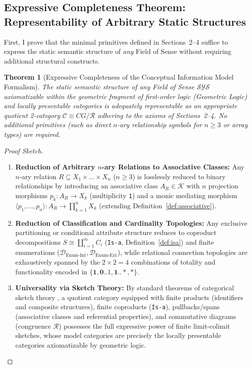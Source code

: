 \documentclass[11pt,a4paper]{article}
\theoremstyle{definition}
\theoremstyle{plain}
\newtheorem{theorem}{Theorem}[section]
\theoremstyle{remark}
\newcommand{\Denumint}{\mathcal{D}_{\mathrm{Enum\text{-}Int}}}
\newcommand{\Denumext}{\mathcal{D}_{\mathrm{Enum\text{-}Ext}}}
\begin{document}
\subsection{Expressive Completeness Theorem: Representability of Arbitrary Static Structures}
First, I prove that the minimal primitives defined in Sections~2--4 suffice to express the static semantic structure of \emph{any} Field of Sense without requiring additional structural constructs.

\begin{theorem}[Expressive Completeness of the Conceptual Information Model Formalism]\label{thm:completeness}
The static semantic structure of any Field of Sense $\mathcal{SYS}$ axiomatizable within the geometric fragment of first-order logic (Geometric Logic) and locally presentable categories is adequately representable as an appropriate quotient 2-category $\mathcal{C} \equiv CG/\mathcal{R}$ adhering to the axioms of Sections~2--4. No additional primitives (such as direct $n$-ary relationship symbols for $n \ge 3$ or array types) are required.
\end{theorem}

\begin{proof}[Proof Sketch]
\begin{enumerate}
    \item \textbf{Reduction of Arbitrary $n$-ary Relations to Associative Classes:} Any $n$-ary relation $R \subseteq X_1 \times \dots \times X_n$ ($n \ge 3$) is losslessly reduced to binary relationships by introducing an associative class $A_R \in \mathcal{K}$ with $n$ projection morphisms $p_k : A_R \to X_k$ (multiplicity \texttt{1}) and a monic mediating morphism $\langle p_1, \dots, p_n \rangle : A_R \to \prod_{k=1}^n X_k$ (extending Definition~\ref{def:associative}).
    \item \textbf{Reduction of Classification and Cardinality Topologies:} Any exclusive partitioning or conditional attribute structure reduces to coproduct decompositions $S \cong \coprod_{i=1}^m C_i$ (\texttt{Is-a}, Definition~\ref{def:isa}) and finite enumerations ($\Denumint, \Denumext$), while relational connection topologies are exhaustively spanned by the $2 \times 2 = 4$ combinations of totality and functionality encoded in $\{\mathbf{1}, \mathbf{0..1}, \mathbf{1..*}, \mathbf{*}\}$.
    \item \textbf{Universality via Sketch Theory:} By standard theorems of categorical sketch theory \cite{gabriel1971,barr1990}, a quotient category equipped with finite products (identifiers and composite structures), finite coproducts (\texttt{Is-a}), pullbacks/spans (associative classes and referential properties), and commutative diagrams (congruence $\mathcal{R}$) possesses the full expressive power of finite limit-colimit sketches, whose model categories are precisely the locally presentable categories axiomatizable by geometric logic. \qedhere
\end{enumerate}
\end{proof}
\end{document}
